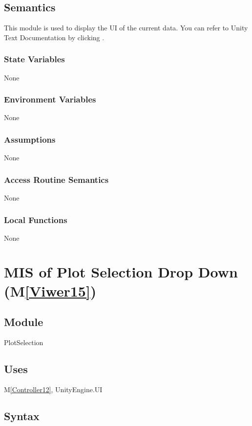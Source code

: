 \documentclass[12pt, titlepage]{article}
\newcommand{\mref}[1]{M\ref{#1}}
\begin{document}
\subsection{Semantics}
This module is used to display the UI of the current data. 
You can refer to Unity Text Documentation by clicking \tref.
\subsubsection{State Variables}
None
\subsubsection{Environment Variables}
None
\subsubsection{Assumptions}
None
\subsubsection{Access Routine Semantics}
None
\subsubsection{Local Functions}
None

\newpage

\newcommand{\dref}{\href{https://docs.unity3d.com/Packages/com.unity.ugui@1.0/manual/script-Dropdown.html}{here}}
\section{MIS of Plot Selection Drop Down (\mref{Viwer15})} 

\subsection{Module}

PlotSelection

\subsection{Uses}

\mref{Controller12}, UnityEngine.UI

\subsection{Syntax}
\end{document}
